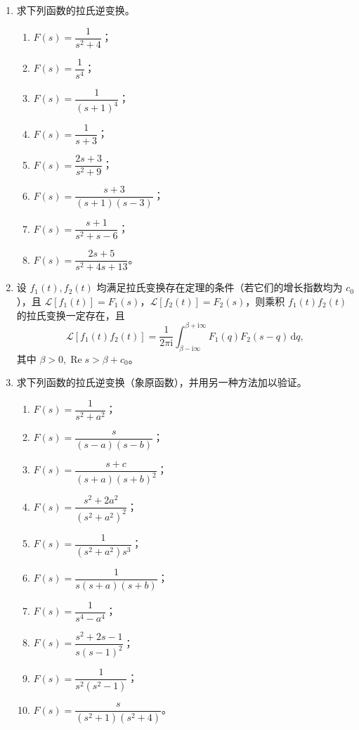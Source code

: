 \documentclass[UTF8,11pt,a4paper]{ctexart}
\newcommand{\dd}{\,\mathrm{d}}
\newcommand{\ii}{\mathrm{i}}
\newcommand{\Ree}{\operatorname{Re}}
\begin{document}
\begin{enumerate}
\item 求下列函数的拉氏逆变换。
  \begin{enumerate}
  \item $F(s)=\dfrac1{s^2+4}$；
  \item $F(s)=\dfrac1{s^4}$；
  \item $F(s)=\dfrac1{(s+1)^4}$；
  \item $F(s)=\dfrac1{s+3}$；
  \item $F(s)=\dfrac{2s+3}{s^2+9}$；
  \item $F(s)=\dfrac{s+3}{(s+1)(s-3)}$；
  \item $F(s)=\dfrac{s+1}{s^2+s-6}$；
  \item $F(s)=\dfrac{2s+5}{s^2+4s+13}$。
  \end{enumerate}

\item 设 $f_1(t),f_2(t)$ 均满足拉氏变换存在定理的条件（若它们的增长指数均为 $c_0$），且
$\mathcal L[f_1(t)]=F_1(s)$，$\mathcal L[f_2(t)]=F_2(s)$，则乘积 $f_1(t)f_2(t)$ 的拉氏变换一定存在，且
\[
\mathcal L[f_1(t)f_2(t)]=\frac1{2\pi\ii}
\int_{\beta-\ii\infty}^{\beta+\ii\infty}F_1(q)F_2(s-q)\dd q,
\]
其中 $\beta>0,\Ree s>\beta+c_0$。

\item 求下列函数的拉氏逆变换（象原函数），并用另一种方法加以验证。
  \begin{enumerate}
  \item $F(s)=\dfrac1{s^2+a^2}$；
  \item $F(s)=\dfrac{s}{(s-a)(s-b)}$；
  \item $F(s)=\dfrac{s+c}{(s+a)(s+b)^2}$；
  \item $F(s)=\dfrac{s^2+2a^2}{(s^2+a^2)^2}$；
  \item $F(s)=\dfrac1{(s^2+a^2)s^3}$；
  \item $F(s)=\dfrac1{s(s+a)(s+b)}$；
  \item $F(s)=\dfrac1{s^4-a^4}$；
  \item $F(s)=\dfrac{s^2+2s-1}{s(s-1)^2}$；
  \item $F(s)=\dfrac1{s^2(s^2-1)}$；
  \item $F(s)=\dfrac{s}{(s^2+1)(s^2+4)}$。
  \end{enumerate}


\end{enumerate}
\end{document}
